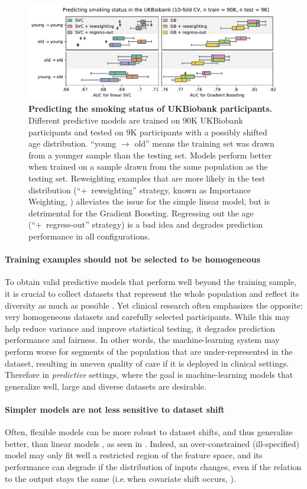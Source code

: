 \documentclass[twocolumn]{article}
\newcommand{\ie}{i.e.\,}
\begin{document}
\begin{figure}[t!]
  \centering
  \includegraphics[width=.7\textwidth]{ukb_smoking_prediction.pdf}
  \caption{\label{fig:ukb-smoking} \textbf{Predicting the smoking status
of UKBiobank participants.} Different predictive models are trained on 90K UKBiobank participants and tested on 9K participants with a possibly shifted age distribution. ``young $\rightarrow$ old'' means the training set was drawn from a younger sample than the testing set. Models perform better when trained on a sample drawn from the same population as the testing set. Reweighting examples that are more likely in the test distribution (``+ reweighting'' strategy, known as Importance Weighting, ) alleviates the issue for the simple linear model, but is detrimental for the Gradient Boosting. Regressing  out the age (``+ regress-out'' strategy) is a bad idea and degrades prediction performance in all configurations.}
\end{figure}

\paragraph{Training examples should not be selected to be homogeneous}
To obtain valid predictive models that perform well beyond the training sample,
it is crucial to collect datasets that represent the whole population and
reflect its diversity as much as possible
\citep{kakarmath2020best,england2019artificial,o2016weapons}. Yet clinical research often
emphasizes the opposite: very
homogeneous datasets and carefully selected participants. While this may help
reduce variance and improve statistical testing, it degrades prediction
performance and fairness. In other words, the machine-learning system may perform worse for segments of the population that are under-represented in the dataset, resulting in uneven quality of care if it is deployed in clinical settings.
Therefore in \emph{predictive} settings, where the goal is 
machine-learning models that generalize well, large and diverse datasets are desirable.

\paragraph{Simpler models are not less sensitive to dataset shift}
Often, flexible models can be more robust to dataset
shifts, and thus generalize better, than linear models
\citep{storkey2009training}, as seen in
. Indeed, an over-constrained (ill-specified) model may
only fit well a restricted region of the feature space, and its performance can
degrade if the distribution of inputs changes, even if the relation to the
output stays the same (\ie when covariate shift occurs, ).
\end{document}
